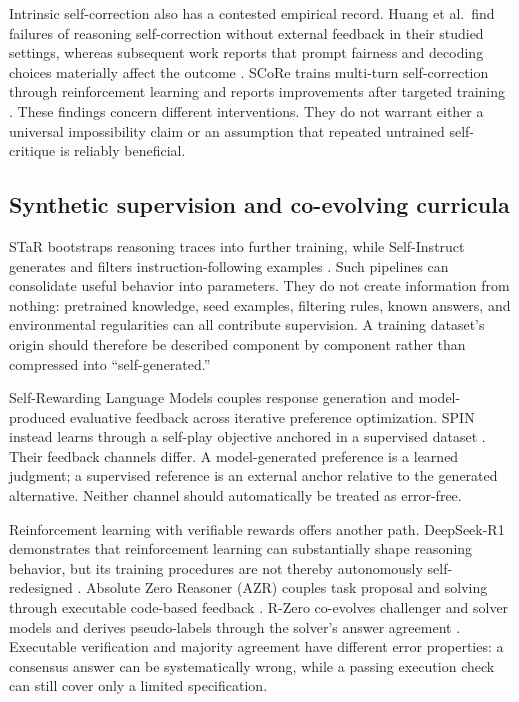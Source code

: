 \documentclass[11pt,american,]{article}
\begin{document}
Intrinsic self-correction also has a contested empirical record. Huang
et al.~find failures of reasoning self-correction without external
feedback in their studied settings, whereas subsequent work reports that
prompt fairness and decoding choices materially affect the outcome
\citep{intrinsic2023, intrinsicpositive2024}. SCoRe trains multi-turn
self-correction through reinforcement learning and reports improvements
after targeted training \citep{score2024}. These findings concern
different interventions. They do not warrant either a universal
impossibility claim or an assumption that repeated untrained
self-critique is reliably beneficial.

\hypertarget{synthetic-supervision-and-co-evolving-curricula}{%
\subsection{Synthetic supervision and co-evolving
curricula}\label{synthetic-supervision-and-co-evolving-curricula}}

STaR bootstraps reasoning traces into further training, while
Self-Instruct generates and filters instruction-following examples
\citep{star2022, selfinstruct2022}. Such pipelines can consolidate
useful behavior into parameters. They do not create information from
nothing: pretrained knowledge, seed examples, filtering rules, known
answers, and environmental regularities can all contribute supervision.
A training dataset's origin should therefore be described component by
component rather than compressed into ``self-generated.''

Self-Rewarding Language Models couples response generation and
model-produced evaluative feedback across iterative preference
optimization. SPIN instead learns through a self-play objective anchored
in a supervised dataset \citep{selfreward2024, spin2024}. Their feedback
channels differ. A model-generated preference is a learned judgment; a
supervised reference is an external anchor relative to the generated
alternative. Neither channel should automatically be treated as
error-free.

Reinforcement learning with verifiable rewards offers another path.
DeepSeek-R1 demonstrates that reinforcement learning can substantially
shape reasoning behavior, but its training procedures are not thereby
autonomously self-redesigned \citep{r12025}. Absolute Zero Reasoner
(AZR) couples task proposal and solving through executable code-based
feedback \citep{azr2025}. R-Zero co-evolves challenger and solver models
and derives pseudo-labels through the solver's answer agreement
\citep{rzero2025}. Executable verification and majority agreement have
different error properties: a consensus answer can be systematically
wrong, while a passing execution check can still cover only a limited
specification.
\end{document}

